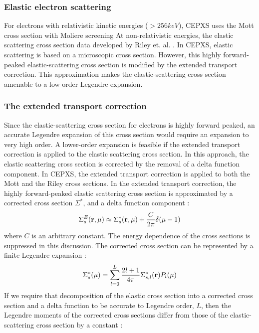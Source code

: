 \subsubsection{Elastic electron scattering}
For electrons with relativistic kinetic energies ($> 256 keV$), CEPXS uses the
Mott cross section with Moliere screening \cite{zerby,berger2} At non-relativistic 
energies, the elastic scattering cross section data developed by Riley et. al. 
\cite{riley}. In CEPXS, elastic scattering is based on a microscopic cross 
section. However, this highly forward-peaked elastic-scattering cross section 
is modified by the extended transport correction. This approximation makes the 
elastic-scattering cross section amenable to a low-order Legendre expansion.

\subsubsection{The extended transport correction}
Since the elastic-scattering cross section for electrons is highly forward
peaked, an accurate Legendre expansion of this cross section would require an
expansion to very high order. A lower-order expansion is feasible if the
extended transport correction is applied to the elastic scattering cross
section. In this approach, the elastic scattering cross section is corrected
by the removal of a delta function component. In CEPXS, the extended transport
correction is applied to both the Mott and the Riley cross sections. In the
extended transport correction, the highly forward-peaked elastic scattering
cross section is approximated by a corrected cross section $\Sigma^*$, and a
delta function component :
\begin{equation}
\Sigma_s^E(\mathbf{r},\mu) \approx \Sigma_s^*(\mathbf{r},\mu) + \frac{C}{2\pi} \delta (\mu-1)
\end{equation}
where $C$ is an arbitrary constant. The energy dependence of the cross
sections is suppressed in this discussion. The corrected cross section can be
represented by a finite Legendre expansion :
\begin{equation}
\Sigma_s^*(\mu) = \sum_{l=0}^{L} \frac{2l+1}{4 \pi} \Sigma_{s,l}^*(\mathbf{r})
P_l(\mu)
\end{equation}
If we require that decomposition of the elastic cross section into a corrected
cross section and a delta function to be accurate to Legendre order, $L$, then
the Legendre moments of the corrected cross sections differ from those of the
elastic-scattering cross section by a constant :
